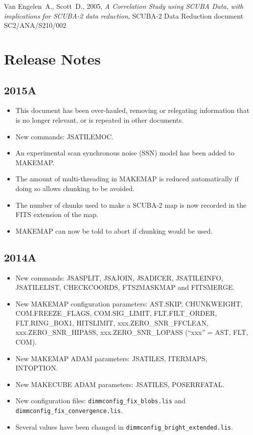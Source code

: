 \documentclass[oneside,11pt]{starlink}
\begin{document}
\begin{thebibliography}{}
Van Engelen~A., Scott~D., 2005, {\it A Correlation Study using SCUBA
  Data, with implications for SCUBA-2 data reduction},
  SCUBA-2 Data Reduction document SC2/ANA/S210/002



\end{thebibliography}

\section{Release Notes}

\subsection{2015A}
\begin{itemize}
\item This document has been over-hauled, removing or relegating
information that is no longer relevant, or is repeated in other documents.
\item New commands: JSATILEMOC.
\item An experimental scan synchronous noise (SSN) model has been added
to MAKEMAP.
\item The amount of multi-threading in MAKEMAP is reduced automatically if doing so
allows chunking to be avoided.
\item The number of chunks used to make a SCUBA-2 map is now recorded in the
FITS extension of the map.
\item MAKEMAP can now be told to abort if chunking would be used.
\end{itemize}

\subsection{2014A}
\begin{itemize}
\item New commands: JSASPLIT, JSAJOIN, JSADICER, JSATILEINFO,
JSATILELIST, CHECKCOORDS, FTS2MASKMAP and FITSMERGE.
\item New MAKEMAP configuration parameters: AST.SKIP, CHUNKWEIGHT,
COM.FREEZE\_FLAGS, COM.SIG\_LIMIT, FLT.FILT\_ORDER, FLT.RING\_BOX1, HITSLIMIT,
xxx.ZERO\_SNR\_FFCLEAN, xxx.ZERO\_SNR\_HIPASS, xxx.ZERO\_SNR\_LOPASS (``xxx'' =
AST, FLT, COM).
\item New MAKEMAP ADAM parameters: JSATILES, ITERMAPS, INTOPTION.
\item New MAKECUBE ADAM parameters: JSATILES, POSERRFATAL.
\item New configuration files: \texttt{dimmconfig\_fix\_blobs.lis} and
\texttt{dimmconfig\_fix\_convergence.lis}.
\item Several values have been changed in \texttt{dimmconfig\_bright\_extended.lis}.
\end{itemize}
\end{document}
